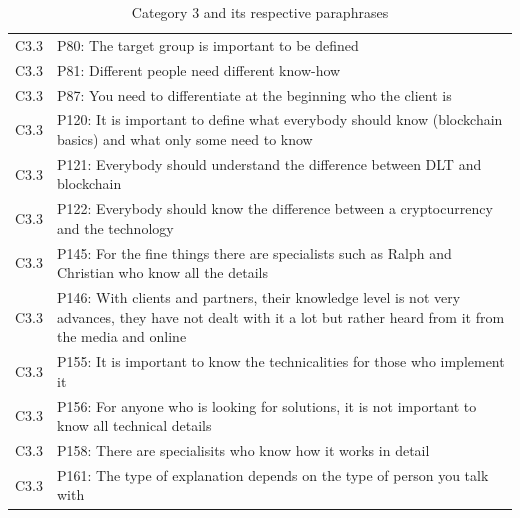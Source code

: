 \begin{table}[H]
\begin{tabularx}{\textwidth}{l|X}
	C3.3 & P80: The target group is important to be defined \\  
	C3.3 & P81: Different people need different know-how \\  
	C3.3 & P87: You need to differentiate at the beginning who the client is \\  
	C3.3 & P120: It is important to define what everybody should know (blockchain basics) and what only some need to know \\  
	C3.3 & P121: Everybody should understand the difference between DLT and blockchain \\  
	C3.3 & P122: Everybody should know the difference between a cryptocurrency and the technology \\  
	C3.3 & P145: For the fine things there are specialists such as Ralph and Christian who know all the details \\  
	C3.3 & P146: With clients and partners, their knowledge level is not very advances, they have not dealt with it a lot but rather heard from it from the media and online \\  
	C3.3 & P155: It is important to know the technicalities for those who implement it \\  
	C3.3 & P156: For anyone who is looking for solutions, it is not important to know all technical details \\  
	C3.3 & P158: There are specialisits who know how it works in detail \\  
	C3.3 & P161: The type of explanation depends on the type of person you talk with \\  
    \end{tabularx}
    \caption{Category 3 and its respective paraphrases}
\end{table}

